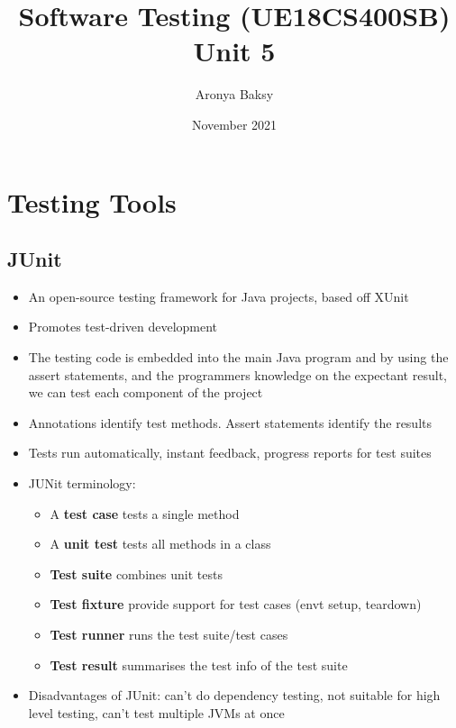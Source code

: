 \documentclass{article}
\title{Software Testing (UE18CS400SB) \\ Unit 5}
\author{Aronya Baksy}
\date{November 2021}
\begin{document}
\maketitle
\section{Testing Tools}
\subsection{JUnit}
\begin{itemize}
    \item An open-source testing framework for Java projects, based off XUnit
    
    \item Promotes test-driven development
    
    \item The testing code is embedded into the main  Java program and by using the assert  statements, and the programmers knowledge  on the expectant result, we can test each  component of the project
    
    \item Annotations identify test methods. Assert statements identify the results
    
    \item Tests run automatically, instant feedback, progress reports for test suites
    
    \item JUNit terminology:
    \begin{itemize}
        \item A \textbf{test case} tests a single method
        
        \item A \textbf{unit test} tests all methods in a class
        
        \item \textbf{Test suite} combines unit tests
        
        \item \textbf{Test fixture} provide support for test cases (envt setup, teardown)
        
        \item \textbf{Test runner} runs the test suite/test cases
        
        \item \textbf{Test result} summarises the test info of the test suite
    \end{itemize}
    
    \item Disadvantages of JUnit: can't do dependency testing, not suitable for high level testing, can't test multiple JVMs at once
\end{itemize}
\end{document}
